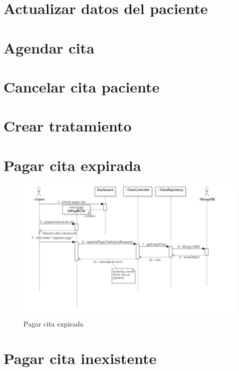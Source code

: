 
\section{Actualizar datos del paciente}

\section{Agendar cita}

\section{Cancelar cita paciente}

\section{ Crear tratamiento}

\section{Pagar cita expirada}

\begin{figure}[htbp!]
	\centering
	\includegraphics[width=1\textwidth]{uml/DiagramasSecuencia/DavidPacheco/pagar-cita-cita-expirada}
	\caption{Pagar cita expirada}
\end{figure}
\newpage

\section{Pagar cita inexistente}

